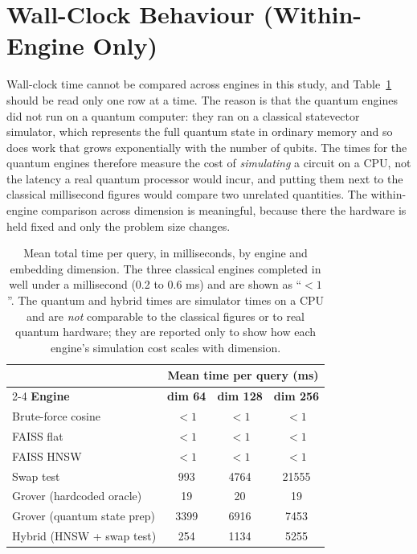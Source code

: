 \section{Wall-Clock Behaviour (Within-Engine Only)}
\label{sec:results:walltime}


Wall-clock time cannot be compared across engines in this study, and
Table~\ref{tab:walltime} should be read only one row at a time. The reason is
that the quantum engines did not run on a quantum computer: they ran on a
classical statevector simulator, which represents the full quantum state in
ordinary memory and so does work that grows exponentially with the number of
qubits. The times for the quantum engines therefore measure the cost of
\emph{simulating} a circuit on a CPU, not the latency a real quantum processor
would incur, and putting them next to the classical millisecond figures would
compare two unrelated quantities. The within-engine comparison across dimension
is meaningful, because there the hardware is held fixed and only the problem size
changes.

\begin{table}[htbp]
  \centering
  \caption[Mean query time by engine and dimension]{Mean total time per query,
  in milliseconds, by engine and embedding
  dimension. The three classical engines completed in well under a millisecond
  (0.2 to 0.6 ms) and are shown as ``$<1$''. The quantum and hybrid times are
  simulator times on a CPU and are \emph{not} comparable to the classical
  figures or to real quantum hardware; they are reported only to show how each
  engine's simulation cost scales with dimension.}
  \label{tab:walltime}
  \begin{tabularx}{\linewidth}{Xccc}
    \toprule
    & \multicolumn{3}{c}{\textbf{Mean time per query (ms)}} \\
    \cmidrule(lr){2-4}
    \textbf{Engine} & \textbf{dim 64} & \textbf{dim 128} & \textbf{dim 256} \\
    \midrule
    Brute-force cosine          & $<1$ & $<1$  & $<1$ \\
    FAISS flat                  & $<1$ & $<1$  & $<1$ \\
    FAISS HNSW                  & $<1$ & $<1$  & $<1$ \\
    \addlinespace
    Swap test                   & 993  & 4764  & 21555 \\
    Grover (hardcoded oracle)   & 19   & 20    & 19 \\
    Grover (quantum state prep) & 3399 & 6916  & 7453 \\
    Hybrid (HNSW + swap test)   & 254  & 1134  & 5255 \\
    \bottomrule
  \end{tabularx}
\end{table}

